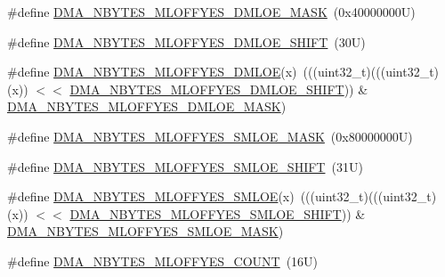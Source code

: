 \begin{DoxyCompactItemize}
\item 
\#define \mbox{\hyperlink{group___d_m_a___register___masks_ga76a7714303966593beffe85120eb3620}{D\+M\+A\+\_\+\+N\+B\+Y\+T\+E\+S\+\_\+\+M\+L\+O\+F\+F\+Y\+E\+S\+\_\+\+D\+M\+L\+O\+E\+\_\+\+M\+A\+SK}}~(0x40000000\+U)
\item 
\#define \mbox{\hyperlink{group___d_m_a___register___masks_ga6a2d840f400f7f2e0bff92c1696d933b}{D\+M\+A\+\_\+\+N\+B\+Y\+T\+E\+S\+\_\+\+M\+L\+O\+F\+F\+Y\+E\+S\+\_\+\+D\+M\+L\+O\+E\+\_\+\+S\+H\+I\+FT}}~(30\+U)
\item 
\#define \mbox{\hyperlink{group___d_m_a___register___masks_gae59c79342f2b0707a2e7a49fe4ea6944}{D\+M\+A\+\_\+\+N\+B\+Y\+T\+E\+S\+\_\+\+M\+L\+O\+F\+F\+Y\+E\+S\+\_\+\+D\+M\+L\+OE}}(x)~(((uint32\+\_\+t)(((uint32\+\_\+t)(x)) $<$$<$ \mbox{\hyperlink{group___d_m_a___register___masks_ga6a2d840f400f7f2e0bff92c1696d933b}{D\+M\+A\+\_\+\+N\+B\+Y\+T\+E\+S\+\_\+\+M\+L\+O\+F\+F\+Y\+E\+S\+\_\+\+D\+M\+L\+O\+E\+\_\+\+S\+H\+I\+FT}})) \& \mbox{\hyperlink{group___d_m_a___register___masks_ga76a7714303966593beffe85120eb3620}{D\+M\+A\+\_\+\+N\+B\+Y\+T\+E\+S\+\_\+\+M\+L\+O\+F\+F\+Y\+E\+S\+\_\+\+D\+M\+L\+O\+E\+\_\+\+M\+A\+SK}})
\item 
\#define \mbox{\hyperlink{group___d_m_a___register___masks_ga3fc0c1eff32a41d0111c33ae3ba4c130}{D\+M\+A\+\_\+\+N\+B\+Y\+T\+E\+S\+\_\+\+M\+L\+O\+F\+F\+Y\+E\+S\+\_\+\+S\+M\+L\+O\+E\+\_\+\+M\+A\+SK}}~(0x80000000\+U)
\item 
\#define \mbox{\hyperlink{group___d_m_a___register___masks_ga35f2f83a6af667046813440107156960}{D\+M\+A\+\_\+\+N\+B\+Y\+T\+E\+S\+\_\+\+M\+L\+O\+F\+F\+Y\+E\+S\+\_\+\+S\+M\+L\+O\+E\+\_\+\+S\+H\+I\+FT}}~(31\+U)
\item 
\#define \mbox{\hyperlink{group___d_m_a___register___masks_ga4b5f1e12aa0fe559344707840a841b06}{D\+M\+A\+\_\+\+N\+B\+Y\+T\+E\+S\+\_\+\+M\+L\+O\+F\+F\+Y\+E\+S\+\_\+\+S\+M\+L\+OE}}(x)~(((uint32\+\_\+t)(((uint32\+\_\+t)(x)) $<$$<$ \mbox{\hyperlink{group___d_m_a___register___masks_ga35f2f83a6af667046813440107156960}{D\+M\+A\+\_\+\+N\+B\+Y\+T\+E\+S\+\_\+\+M\+L\+O\+F\+F\+Y\+E\+S\+\_\+\+S\+M\+L\+O\+E\+\_\+\+S\+H\+I\+FT}})) \& \mbox{\hyperlink{group___d_m_a___register___masks_ga3fc0c1eff32a41d0111c33ae3ba4c130}{D\+M\+A\+\_\+\+N\+B\+Y\+T\+E\+S\+\_\+\+M\+L\+O\+F\+F\+Y\+E\+S\+\_\+\+S\+M\+L\+O\+E\+\_\+\+M\+A\+SK}})
\item 
\#define \mbox{\hyperlink{group___d_m_a___register___masks_ga640cb010b70a284a4687c0ed6eef44e7}{D\+M\+A\+\_\+\+N\+B\+Y\+T\+E\+S\+\_\+\+M\+L\+O\+F\+F\+Y\+E\+S\+\_\+\+C\+O\+U\+NT}}~(16\+U)
\end{DoxyCompactItemize}
